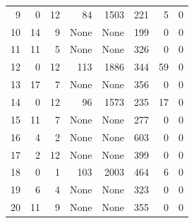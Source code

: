 \begin{longtable}{r r r r r r r r}
9 & 0 & 12 & 84 & 1503 & 221 & 5 & 0 \\
10 & 14 & 9 & None & None & 199 & 0 & 0 \\
11 & 11 & 5 & None & None & 326 & 0 & 0 \\
12 & 0 & 12 & 113 & 1886 & 344 & 59 & 0 \\
13 & 17 & 7 & None & None & 356 & 0 & 0 \\
14 & 0 & 12 & 96 & 1573 & 235 & 17 & 0 \\
15 & 11 & 7 & None & None & 277 & 0 & 0 \\
16 & 4 & 2 & None & None & 603 & 0 & 0 \\
17 & 2 & 12 & None & None & 399 & 0 & 0 \\
18 & 0 & 1 & 103 & 2003 & 464 & 6 & 0 \\
19 & 6 & 4 & None & None & 323 & 0 & 0 \\
20 & 11 & 9 & None & None & 355 & 0 & 0 \\
\end{longtable}
\endgroup
{}

